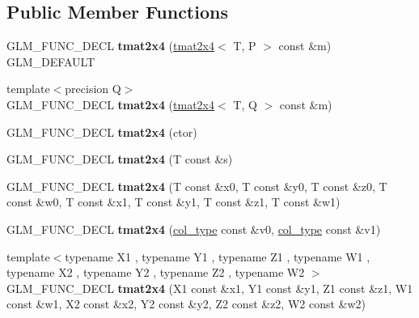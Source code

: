 \subsection*{Public Member Functions}
\begin{DoxyCompactItemize}
\item 
\hypertarget{structglm_1_1tmat2x4_a4f619511e1e69d88ca2bfb4e69702a91}{G\-L\-M\-\_\-\-F\-U\-N\-C\-\_\-\-D\-E\-C\-L {\bfseries tmat2x4} (\hyperlink{structglm_1_1tmat2x4}{tmat2x4}$<$ T, P $>$ const \&m) G\-L\-M\-\_\-\-D\-E\-F\-A\-U\-L\-T}\label{structglm_1_1tmat2x4_a4f619511e1e69d88ca2bfb4e69702a91}

\item 
\hypertarget{structglm_1_1tmat2x4_acde6e5b863afd65e1608a8fe2a374d53}{{\footnotesize template$<$precision Q$>$ }\\G\-L\-M\-\_\-\-F\-U\-N\-C\-\_\-\-D\-E\-C\-L {\bfseries tmat2x4} (\hyperlink{structglm_1_1tmat2x4}{tmat2x4}$<$ T, Q $>$ const \&m)}\label{structglm_1_1tmat2x4_acde6e5b863afd65e1608a8fe2a374d53}

\item 
\hypertarget{structglm_1_1tmat2x4_a6d1f40a99bf16e56db7c0238cc3a06a7}{G\-L\-M\-\_\-\-F\-U\-N\-C\-\_\-\-D\-E\-C\-L {\bfseries tmat2x4} (ctor)}\label{structglm_1_1tmat2x4_a6d1f40a99bf16e56db7c0238cc3a06a7}

\item 
\hypertarget{structglm_1_1tmat2x4_afd49350ff9250ce34fdfa5d4558ea2eb}{G\-L\-M\-\_\-\-F\-U\-N\-C\-\_\-\-D\-E\-C\-L {\bfseries tmat2x4} (T const \&s)}\label{structglm_1_1tmat2x4_afd49350ff9250ce34fdfa5d4558ea2eb}

\item 
\hypertarget{structglm_1_1tmat2x4_aa6726efd5996095855446f8f917bdba4}{G\-L\-M\-\_\-\-F\-U\-N\-C\-\_\-\-D\-E\-C\-L {\bfseries tmat2x4} (T const \&x0, T const \&y0, T const \&z0, T const \&w0, T const \&x1, T const \&y1, T const \&z1, T const \&w1)}\label{structglm_1_1tmat2x4_aa6726efd5996095855446f8f917bdba4}

\item 
\hypertarget{structglm_1_1tmat2x4_ab80c8f32add0a9897a7d179597f07a25}{G\-L\-M\-\_\-\-F\-U\-N\-C\-\_\-\-D\-E\-C\-L {\bfseries tmat2x4} (\hyperlink{structglm_1_1tvec4}{col\-\_\-type} const \&v0, \hyperlink{structglm_1_1tvec4}{col\-\_\-type} const \&v1)}\label{structglm_1_1tmat2x4_ab80c8f32add0a9897a7d179597f07a25}

\item 
\hypertarget{structglm_1_1tmat2x4_a2b4b734e70d43d8261dbad49b9138fa2}{{\footnotesize template$<$typename X1 , typename Y1 , typename Z1 , typename W1 , typename X2 , typename Y2 , typename Z2 , typename W2 $>$ }\\G\-L\-M\-\_\-\-F\-U\-N\-C\-\_\-\-D\-E\-C\-L {\bfseries tmat2x4} (X1 const \&x1, Y1 const \&y1, Z1 const \&z1, W1 const \&w1, X2 const \&x2, Y2 const \&y2, Z2 const \&z2, W2 const \&w2)}\label{structglm_1_1tmat2x4_a2b4b734e70d43d8261dbad49b9138fa2}


\end{DoxyCompactItemize}
